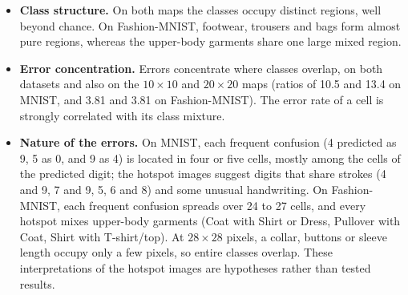 \documentclass{scrartcl}
\begin{document}
\begin{itemize}
  \item \textbf{Class structure.} On both maps the classes occupy distinct regions, well beyond chance. On Fashion-MNIST, footwear, trousers and bags form almost pure regions, whereas the upper-body garments share one large mixed region.
  \item \textbf{Error concentration.} Errors concentrate where classes overlap, on both datasets and also on the $10\times10$ and $20\times20$ maps (ratios of 10.5 and 13.4 on MNIST, and 3.81 and 3.81 on Fashion-MNIST). The error rate of a cell is strongly correlated with its class mixture.
  \item \textbf{Nature of the errors.} On MNIST, each frequent confusion (4 predicted as 9, 5 as 0, and 9 as 4) is located in four or five cells, mostly among the cells of the predicted digit; the hotspot images suggest digits that share strokes (4 and 9, 7 and 9, 5, 6 and 8) and some unusual handwriting. On Fashion-MNIST, each frequent confusion spreads over 24 to 27 cells, and every hotspot mixes upper-body garments (Coat with Shirt or Dress, Pullover with Coat, Shirt with T-shirt/top). At $28\times28$ pixels, a collar, buttons or sleeve length occupy only a few pixels, so entire classes overlap. These interpretations of the hotspot images are hypotheses rather than tested results.
\end{itemize}
\end{document}
